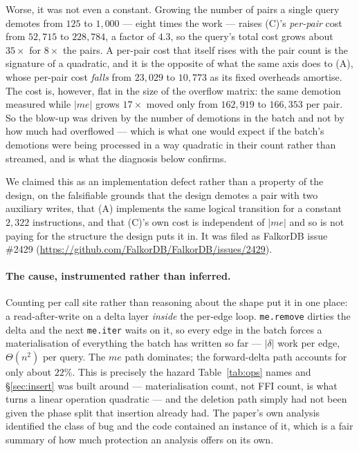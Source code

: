 \documentclass[11pt,a4paper]{article}
\theoremstyle{plain}
\theoremstyle{definition}
\theoremstyle{remark}
\begin{document}
Worse, it was not even a constant. Growing the number of pairs a single query
demotes from $125$ to $1{,}000$ --- eight times the work --- raises (C)'s
\emph{per-pair} cost from $52{,}715$ to $228{,}784$, a factor of $4.3$, so the
query's total cost grows about $35\times$ for $8\times$ the pairs. A per-pair
cost that itself rises with the pair count is the signature of a quadratic, and
it is the opposite of what the same axis does to (A), whose per-pair cost
\emph{falls} from $23{,}029$ to $10{,}773$ as its fixed overheads amortise.
The cost is, however, flat in the size of the overflow matrix: the same
demotion measured while $|me|$ grows $17\times$ moved only from $162{,}919$ to
$166{,}353$ per pair. So the blow-up was driven by the number of demotions in
the batch and not by how much had overflowed --- which is what one would expect
if the batch's demotions were being processed in a way quadratic in their count
rather than streamed, and is what the diagnosis below confirms.

We claimed this as an implementation defect rather than a property of the
design, on the falsifiable grounds that the design demotes a pair with two
auxiliary writes, that (A) implements the same logical transition for a constant
$2{,}322$ instructions, and that (C)'s own cost is independent of $|me|$ and so
is not paying for the structure the design puts it in. It was filed as FalkorDB
issue \#2429 (\url{https://github.com/FalkorDB/FalkorDB/issues/2429}).

\paragraph{The cause, instrumented rather than inferred.} Counting per call site
rather than reasoning about the shape put it in one place: a read-after-write on
a delta layer \emph{inside} the per-edge loop. \texttt{me.remove} dirties the
delta and the next \texttt{me.iter} waits on it, so every edge in the batch
forces a materialisation of everything the batch has written so far --- $|\delta|$
work per edge, $\Theta(n^2)$ per query. The $me$ path dominates; the
forward-delta path accounts for only about $22\%$. This is precisely the hazard
Table~\ref{tab:ops} names and \S\ref{sec:insert} was built around ---
materialisation count, not FFI count, is what turns a linear operation
quadratic --- and the deletion path simply had not been given the phase split
that insertion already had. The paper's own analysis identified the class of bug
and the code contained an instance of it, which is a fair summary of how much
protection an analysis offers on its own.
\end{document}

